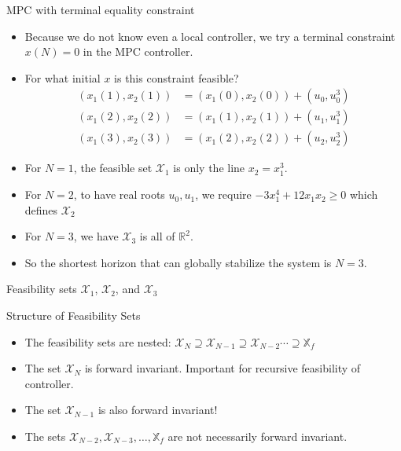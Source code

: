 \documentclass{beamer}
\newcommand{\bbR}{\mathbb{R}}
\begin{document}
\begin{frame}{MPC with terminal equality constraint}

\begin{itemize}
\item Because we do \alert{not} know even a \alert{local controller}, we try a terminal
constraint $x(N)=0$ in the MPC controller. 
\item For what initial $x$ is this constraint feasible?
\begin{align*}
(x_1(1), x_2(1)) &= (x_1(0), x_2(0)) + (u_0, u^3_0) \\
(x_1(2), x_2(2)) &= (x_1(1),x_2(1)) + (u_1, u_1^3) \\
(x_1(3), x_2(3)) &= (x_1(2), x_2(2)) + (u_2, u_2^3)
\end{align*}

\item  For $N=1$, the feasible set $\mathcal{X}_1$ is only the line $x_2 = x_1^3$. 
\item For $N=2$, to have real roots $u_0, u_1$, we require 
$−3x_1^4 + 12x_1x_2 \geq 0$ which defines $\mathcal{X}_2$
\item For $N=3$, we have $\mathcal{X}_3$ is all of $\bbR^2$. 
\item So the shortest horizon that can globally stabilize the system
  is $N=3$.
\end{itemize}
\end{frame}


\begin{frame}{Feasibility sets $\mathcal{X}_1$, $\mathcal{X}_2$, and
  $\mathcal{X}_3$}
\centerline{\resizebox{0.8\textwidth}{!}{}}

\end{frame}

\begin{frame}{Structure of Feasibility Sets}


\centerline{\resizebox{0.6\textwidth}{!}{}}

\begin{block}{}
\begin{itemize}
\item The feasibility sets are nested: $\mathcal{X}_N \supseteq
  \mathcal{X}_{N-1} \supseteq \mathcal{X}_{N-2} \cdots \supseteq
  \mathbb{X}_f$
\item The set $\mathcal{X}_N$ is forward invariant. Important for
  recursive feasibility of controller.
\item The set $\mathcal{X}_{N-1}$ is also forward invariant!
\item The sets $\mathcal{X}_{N-2}, \mathcal{X}_{N-3},\ldots,
  \mathbb{X}_f$ are not necessarily forward invariant.
\end{itemize}
\end{block}
\end{frame}
\end{document}
